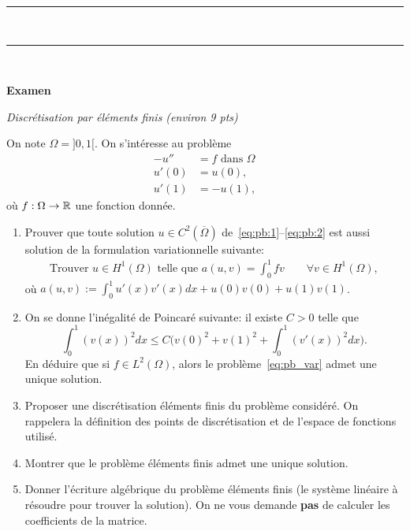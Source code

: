 \documentclass[12pt]{article}
\begin{document}
\noindent
{\rule{\textwidth}{.2mm}}\\
\renewcommand{\labelenumi}{(\alph{enumi})}

{\rule{\textwidth}{.2mm}}\\




\setcounter{MaxMatrixCols}{15} %

\begin{center}
{\bf Examen}
\end{center}

\begin{exo}
  \textit{Discr\'etisation par \'el\'ements finis (environ 9 pts)}

  On note $\Omega = ]0,1[$. On s'int\'eresse au probl\`eme
  \begin{align}
    \label{eq:pb:1}
    - u'' &= f \text{ dans } \Omega
    \\
    u'(0) &= u(0) ,
    \\
    \label{eq:pb:2}
     u'(1) &= - u(1) ,
  \end{align}
  o\`u $f : \Omega \to \mathbb{R}$ une fonction donn\'ee.
  
  \begin{enumerate}
  \item Prouver que toute solution $u \in C^2(\overline{\Omega})$ de~\eqref{eq:pb:1}--\eqref{eq:pb:2}
    est aussi solution de la formulation variationnelle suivante:
    \begin{align}
      \label{eq:pb_var}
      \text{Trouver } u \in H^1(\Omega) \text{ telle que }
      a(u,v)
      = \int_{0}^1 f v \qquad
      \forall v \in H^{1}(\Omega) ,
    \end{align}
    o\`u $a(u,v) := \int_{0}^1 u'(x) v'(x) dx + u(0) v(0) + u(1) v(1)$.
  \item On se donne l'in\'egalit\'e de Poincar\'e suivante: il existe $C > 0$ telle que
    \[
      \int_{0}^1 (v(x))^2 dx \leq C \Big( v(0)^2 + v(1)^2 + \int_0^1 (v'(x))^2 dx \Big) .
    \]
    En d\'eduire que si $f \in L^2(\Omega)$, alors
    le probl\`eme~\eqref{eq:pb_var} admet une unique solution.

  \item Proposer une discr\'etisation \'el\'ements finis du probl\`eme consid\'er\'e.
    On rappelera la d\'efinition des points de discr\'etisation et de l'espace de fonctions utilis\'e.

  \item Montrer que le probl\`eme \'el\'ements finis admet une unique solution.

  \item Donner l'\'ecriture alg\'ebrique du probl\`eme \'el\'ements finis
    (le syst\`eme lin\'eaire \`a r\'esoudre pour trouver la solution).
    On ne vous demande \textbf{pas} de calculer les coefficients de la matrice.
  \end{enumerate}

\end{exo}
\end{document}
